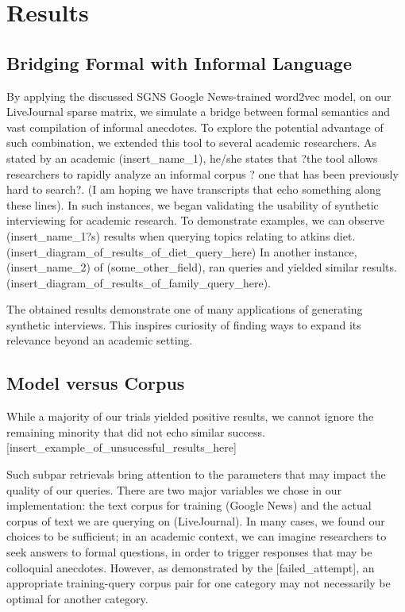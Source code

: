 \documentclass{sigchi}
\begin{document}
\section{Results}

\subsection{Bridging Formal with Informal Language}
By applying the discussed SGNS Google News-trained word2vec model, on our LiveJournal sparse matrix, we simulate a bridge between formal semantics and vast compilation of informal anecdotes. To explore the potential advantage of such combination, we extended this tool to several academic researchers. As stated by an academic (insert\_name\_1), he/she states that ?the tool allows researchers to rapidly analyze an informal corpus ? one that has been previously hard to search?. (I am hoping we have transcripts that echo something along these lines). In such instances, we began validating the usability of synthetic interviewing for academic research. To demonstrate examples, we can observe (insert\_name\_1?s) 
results when querying topics relating to atkins diet.  (insert\_diagram\_of\_results\_of\_diet\_query\_here) In another instance, (insert\_name\_2) of (some\_other\_field), ran queries and yielded similar results. (insert\_diagram\_of\_results\_of\_family\_query\_here). 

The obtained results demonstrate one of many applications of generating synthetic interviews. This inspires curiosity of finding ways to expand its relevance beyond an academic setting. 

\subsection{Model versus Corpus}
While a majority of our trials yielded positive results, we cannot ignore the remaining minority that did not echo similar success. [insert\_example\_of\_unsucessful\_results\_here]

Such subpar retrievals bring attention to the parameters that may impact the quality of our queries. There are two major variables we chose in our implementation: the text corpus for training (Google News) and the actual corpus of text we are querying on (LiveJournal). In many cases, we found our choices to be sufficient; in an academic context, we can imagine researchers to seek answers to formal questions, in order to trigger responses that may be colloquial anecdotes. However, as demonstrated by the [failed\_attempt], an appropriate training-query corpus pair for one category may not necessarily be optimal for another category.
\end{document}
